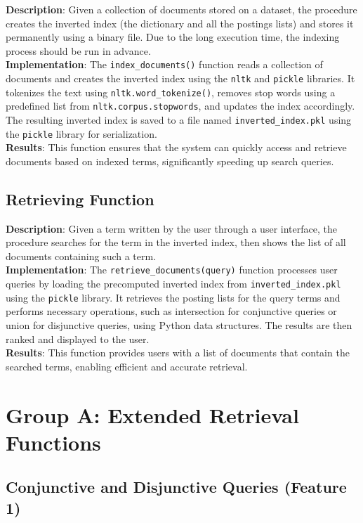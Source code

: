 \documentclass[a4paper,10pt]{article}
\begin{document}
\textbf{Description}: Given a collection of documents stored on a dataset, the procedure creates the inverted index (the dictionary and all the postings lists) and stores it permanently using a binary file. Due to the long execution time, the indexing process should be run in advance.\\
\textbf{Implementation}: The \texttt{index\_documents()} function reads a collection of documents and creates the inverted index using the \texttt{nltk} and \texttt{pickle} libraries. It tokenizes the text using \texttt{nltk.word\_tokenize()}, removes stop words using a predefined list from \texttt{nltk.corpus.stopwords}, and updates the index accordingly. The resulting inverted index is saved to a file named \texttt{inverted\_index.pkl} using the \texttt{pickle} library for serialization.\\
\textbf{Results}: This function ensures that the system can quickly access and retrieve documents based on indexed terms, significantly speeding up search queries.

\subsection{Retrieving Function}

\textbf{Description}: Given a term written by the user through a user interface, the procedure searches for the term in the inverted index, then shows the list of all documents containing such a term.\\
\textbf{Implementation}: The \texttt{retrieve\_documents(query)} function processes user queries by loading the precomputed inverted index from \texttt{inverted\_index.pkl} using the \texttt{pickle} library. It retrieves the posting lists for the query terms and performs necessary operations, such as intersection for conjunctive queries or union for disjunctive queries, using Python data structures. The results are then ranked and displayed to the user.\\
\textbf{Results}: This function provides users with a list of documents that contain the searched terms, enabling efficient and accurate retrieval.

\section{Group A: Extended Retrieval Functions}

\subsection{Conjunctive and Disjunctive Queries (Feature 1)}
\end{document}
